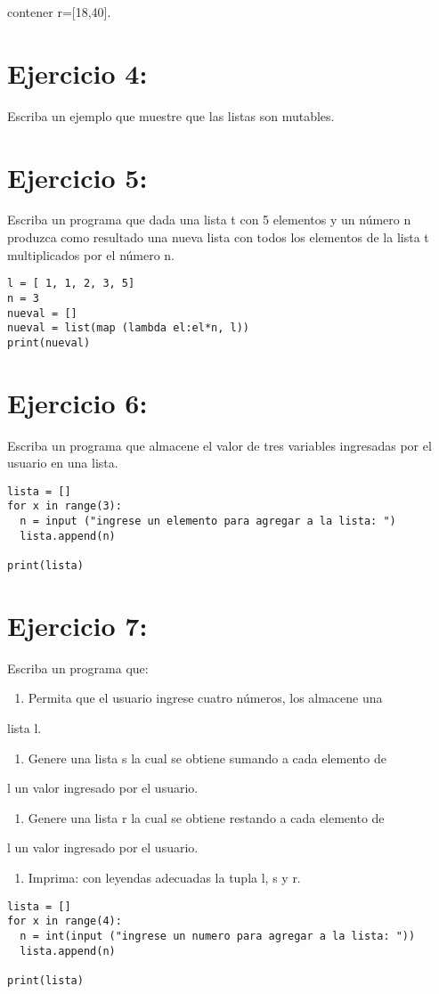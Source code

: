 \documentclass[11pt]{article}
\begin{document}
contener r=[18,40].
\section{Ejercicio 4:}
\label{sec:orgea5178e}
Escriba un ejemplo que muestre que las listas son mutables.
\section{Ejercicio 5:}
\label{sec:orgd5e9e9f}
Escriba un programa que dada una lista t con 5 elementos y
un número n produzca como resultado una nueva lista con todos los
elementos de la lista t multiplicados por el número n.
\begin{verbatim}
l = [ 1, 1, 2, 3, 5]
n = 3
nueval = []
nueval = list(map (lambda el:el*n, l))
print(nueval)
\end{verbatim}

\section{Ejercicio 6:}
\label{sec:orgc642aa1}
Escriba un programa que almacene el valor de tres variables
ingresadas por el usuario en una lista.
\begin{verbatim}
lista = []
for x in range(3):
  n = input ("ingrese un elemento para agregar a la lista: ")
  lista.append(n)

print(lista)
\end{verbatim}
\section{Ejercicio 7:}
\label{sec:org785c6d5}
Escriba un programa que:
\begin{enumerate}
\item Permita que el usuario ingrese cuatro números, los almacene una
\end{enumerate}
lista l.
\begin{enumerate}
\item Genere una lista s la cual se obtiene sumando a cada elemento de
\end{enumerate}
l un valor ingresado por el usuario.
\begin{enumerate}
\item Genere una lista r la cual se obtiene restando a cada elemento de
\end{enumerate}
l un valor ingresado por el usuario.
\begin{enumerate}
\item Imprima: con leyendas adecuadas la tupla l, s y r.
\end{enumerate}
\begin{verbatim}
lista = []
for x in range(4):
  n = int(input ("ingrese un numero para agregar a la lista: "))
  lista.append(n)

print(lista)
\end{verbatim}
\end{document}
